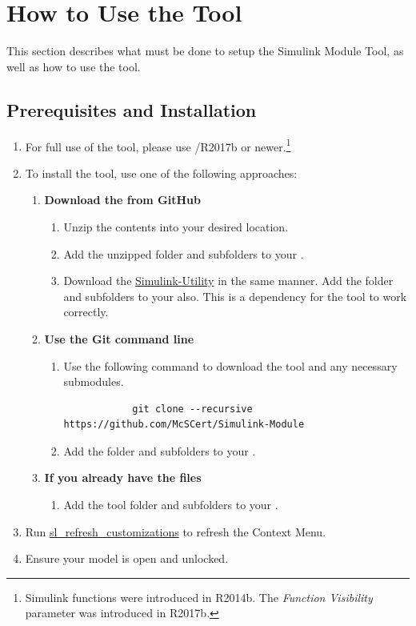 \documentclass{article}
\makeatletter
\newcommand{\ToolName}{Simulink Module Tool\@\xspace}
\makeatother
\begin{document}
\section{How to Use the Tool}
This section describes what must be done to setup the \ToolName, as well as how to use the tool.

\subsection{Prerequisites and Installation}

\begin{enumerate}
	\item For full use of the tool, please use \matlab/\Simulink R2017b or newer.\footnote{Simulink functions were introduced in R2014b. The \emph{Function Visibility} parameter was introduced in R2017b.}

	\item To install the tool, use one of the following approaches:
	\begin{enumerate}
		\item \textbf{Download the  from GitHub}
		\begin{enumerate} 
			\item Unzip the contents into your desired location. 
			\item Add the unzipped folder and subfolders to your \mpath. 
			\item Download the \href{https://github.com/McSCert/Simulink-Utility}{Simulink-Utility} in the same manner. Add the folder and subfolders to your \mpath also. This is a dependency for the tool to work correctly.
		\end{enumerate}
		\item \textbf{Use the Git command line}
		\begin{enumerate}
			\item Use the following command to download the tool and any necessary submodules. 
			\begin{verbatim}
			git clone --recursive https://github.com/McSCert/Simulink-Module
			\end{verbatim}
			\item Add the folder and subfolders to your \mpath. 
		\end{enumerate}
		\item \textbf{If you already have the files}
		\begin{enumerate}
			\item Add the tool folder and subfolders to your \mpath. 
		\end{enumerate}
	\end{enumerate}
	\item Run \href{https://www.mathworks.com/help/simulink/ug/registering-customizations.html}{sl\_refresh\_customizations} to refresh the Context Menu. 
	\item Ensure your model is open and unlocked.
\end{enumerate}
\end{document}
